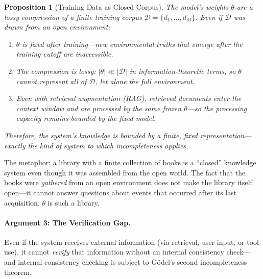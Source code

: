 \documentclass[11pt]{article}
\newtheorem{proposition}{Proposition}
\begin{document}
\begin{proposition}[Training Data as Closed Corpus]
\label{prop:training-closure}
The model's weights $\theta$ are a lossy compression of a finite training
corpus $\mathcal{D} = \{d_1, \ldots, d_M\}$. Even if $\mathcal{D}$ was drawn
from an open environment:
\begin{enumerate}
\item[(a)] $\theta$ is fixed after training---new environmental truths that
      emerge after the training cutoff are inaccessible.
\item[(b)] The compression is lossy: $|\theta| \ll |\mathcal{D}|$ in
      information-theoretic terms, so $\theta$ cannot represent all of
      $\mathcal{D}$, let alone the full environment.
\item[(c)] Even with retrieval augmentation (RAG), retrieved documents enter
      the context window and are processed by the same frozen $\theta$---so
      the processing capacity remains bounded by the fixed model.
\end{enumerate}
Therefore, the system's knowledge is bounded by a finite, fixed
representation---exactly the kind of system to which incompleteness applies.
\end{proposition}

\noindent The metaphor: a library with a finite collection of books is a
``closed'' knowledge system even though it was assembled from the open world.
The fact that the books were \textit{gathered} from an open environment does
not make the library itself open---it cannot answer questions about events
that occurred after its last acquisition. $\theta$ is such a library.

\paragraph{Argument 3: The Verification Gap.}

Even if the system receives external information (via retrieval, user input,
or tool use), it cannot \textit{verify} that information without an internal
consistency check---and internal consistency checking is subject to
G\"{o}del's second incompleteness theorem.
\end{document}
